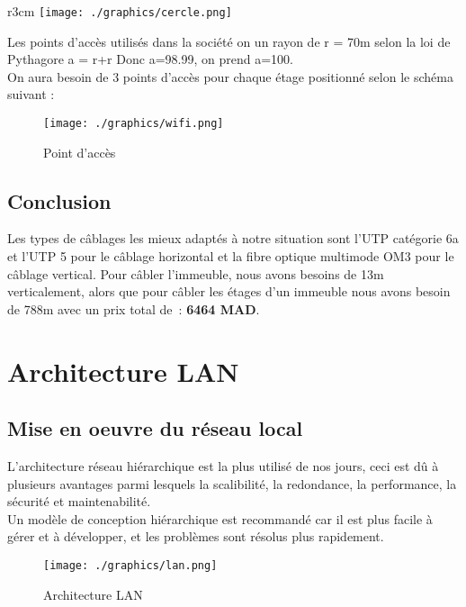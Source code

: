 \documentclass[12pt,a4paper]{report}
\begin{document}
		\begin{wrapfigure} {r}{3cm}
		\texttt{[image: ./graphics/cercle.png]}
		\end{wrapfigure}
		Les points d’accès utilisés dans la société on un rayon de r = 70m selon la loi de Pythagore a\up{2} = r+r
Donc a=98.99, on prend a=100.\\
On aura besoin de 3 points d'accès pour chaque étage positionné selon le schéma suivant :\\
		\begin{figure}[!hbtp]
			\centering
			\texttt{[image: ./graphics/wifi.png]}
			\caption{Point d'accès}
		\end{figure}
			
		\section{Conclusion}
			Les types de câblages les mieux adaptés à notre situation sont l’UTP catégorie 6a et l'UTP 5 pour le câblage horizontal et la fibre optique multimode OM3 pour le câblage vertical.
Pour câbler l’immeuble, nous avons besoins de 13m verticalement, alors que pour câbler les étages d’un immeuble nous avons besoin de 788m avec un prix total de : \textbf{6464 MAD}.

	


			\newpage









		\chapter{Architecture LAN}
		\section{Mise en oeuvre du réseau local}
		L’architecture réseau hiérarchique est la plus utilisé de nos jours, ceci est dû à plusieurs avantages parmi lesquels la scalibilité, la redondance, la performance, la sécurité et maintenabilité.\\
		Un modèle de conception hiérarchique est recommandé car il est plus facile à gérer et à développer, et les problèmes sont résolus plus rapidement.\\

		\begin{figure}[!hbtp]
			\centering
			\texttt{[image: ./graphics/lan.png]}
			\caption{Architecture LAN}
		\end{figure}
		
\end{document}
